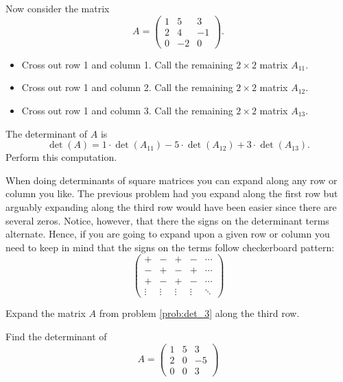 \begin{problem}\label{prob:det_3}
    Now consider the matrix 
    \[ A = \begin{pmatrix} 1 & 5 & 3 \\ 2 & 4 & -1 \\ 0 & -2 & 0 \end{pmatrix}. \]
    \begin{itemize}
        \item Cross out row 1 and column 1. Call the remaining $2 \times 2$ matrix
            $A_{11}$.
        \item Cross out row 1 and column 2. Call the remaining $2 \times 2$ matrix
            $A_{12}$.
        \item Cross out row 1 and column 3. Call the remaining $2 \times 2$ matrix
            $A_{13}$.
    \end{itemize}
    The determinant of $A$ is
    \[ \det(A) = 1 \cdot \det(A_{11}) - 5 \cdot \det(A_{12}) + 3 \cdot \det(A_{13}). \]
    Perform this computation.
\end{problem}

When doing determinants of square matrices you can expand along any row or column you
like.  The previous problem had you expand along the first row but arguably expanding
along the third row would have been easier since there are several zeros.  Notice,
however, that there the signs on the determinant terms alternate.  Hence, if you are going
to expand upon a given row or column you need to keep in mind that the signs on the terms
follow  checkerboard pattern:
\[ \begin{pmatrix} + & - & + & - & \cdots \\
        - & + & - & + & \cdots \\
        + & - & + & - & \cdots \\
    \vdots & \vdots & \vdots & \vdots & \ddots \end{pmatrix} \]

\begin{problem}
    Expand the matrix $A$ from problem \ref{prob:det_3} along the third row.
\end{problem}

\begin{problem}
    Find the determinant of
    \[ A = \begin{pmatrix} 1 & 5 & 3 \\ 2 & 0 & -5 \\ 0 & 0 & 3 \end{pmatrix} \]
\end{problem}
%             



